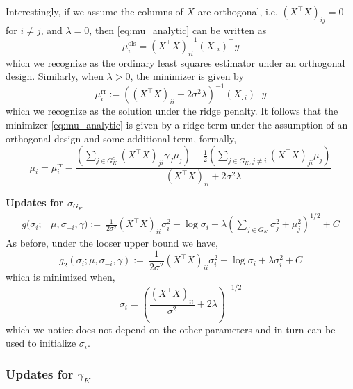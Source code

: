 \documentclass[12pt]{article}
\begin{document}
Interestingly, if we assume the columns of $X$ are orthogonal, i.e. $ (X^\top X)_{ij} = 0$ for $i \neq j$, and $\lambda = 0$, then \eqref{eq:mu_analytic} can be written as
\begin{equation}
    \mu_i^{\text{ols}} = (X^\top X)_{ii}^{-1} (X_{:i})^\top y
\end{equation}
which we recognize as the ordinary least squares estimator under an orthogonal design. Similarly, when $\lambda > 0$, the minimizer is given by
\begin{equation}
    \mu_i^{\text{rr}} := \left((X^\top X)_{ii} + 2\sigma^2 \lambda \right)^{-1} (X_{:i})^\top y
\end{equation}
which we recognize as the solution under the ridge penalty. It follows that the minimizer \eqref{eq:mu_analytic} is given by a ridge term under the assumption of an orthogonal design and some additional term, formally,
\begin{equation}
    \mu_i = \mu_i^{\text{rr}} - \frac{
	\left(\sum_{j \in G_K^c} (X^\top X)_{ji} \gamma_{J} \mu_j \right) +
	\frac{1}{2} \left(\sum_{j \in G_K, j\neq i} (X^\top X)_{ji} \mu_j \right)
    }{
	(X^\top X)_{ii} +
	2 \sigma^2 \lambda 
    }
\end{equation}

\textbf{Updates for $\sigma_{G_K}$}
\begin{equation}
\begin{aligned}
    g(\sigma_i;& \mu, \sigma_{-i}, \gamma) :=\
    \frac{1}{2\sigma^2} (X^\top X)_{ii} \sigma_i^2
-
    \log{\sigma_i}
+
    \lambda \left( \sum_{j \in G_K} 
	\sigma_j^2 + \mu_j^2
    \right)^{1/2} + C
\end{aligned}
\end{equation}
As before, under the looser upper bound we have,
\begin{equation}
    g_2 (\sigma_i; \mu, \sigma_{-i}, \gamma) :=\
    \frac{1}{2\sigma^2} (X^\top X)_{ii} \sigma_i^2
-
    \log{\sigma_i}
+
    \lambda \sigma_i^2 + C
\end{equation}
which is minimized when,
\begin{equation}
    \sigma_i = \left( \frac{(X^\top X)_{ii}}{\sigma^2} + 2 \lambda \right)^{-1/2}
\end{equation}
which we notice does not depend on the other parameters and in turn can be used to initialize $\sigma_i$.

\subsubsection{Updates for $\gamma_K$}
\end{document}
